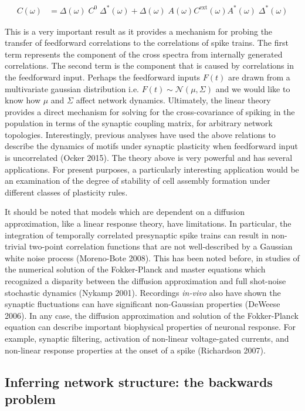 \documentclass{ucetd}
\begin{document}
\begin{align}
C(\omega) &= \Delta(\omega)\;C^{0}\;\Delta^{*}(\omega) + \Delta(\omega)\;A(\omega)C^{\mathrm{ext}}(\omega)A^{*}(\omega)\;\Delta^{*}(\omega)
\end{align} 

This is a very important result as it provides a mechanism for probing the transfer of feedforward correlations to the correlations of spike trains. The first term represents the component of the cross spectra from internally generated correlations. The second term is the component that is caused by correlations in the feedforward input. Perhaps the feedforward inputs $F(t)$ are drawn from a multivariate gaussian distribution i.e. $F(t) \sim \mathcal{N}(\mu,\Sigma)$ and we would like to know how $\mu$ and $\Sigma$ affect network dynamics. Ultimately, the linear theory provides a direct mechanism for solving for the cross-covariance of spiking in the population in terms of the synaptic coupling matrix, for arbitrary network topologies. Interestingly, previous analyses have used the above relations to describe the dynamics of motifs under synaptic plasticity when feedforward input is uncorrelated (Ocker 2015). The theory above is very powerful and has several applications. For present purposes, a particularly interesting application would be an examination of the degree of stability of cell assembly formation under different classes of plasticity rules. 

It should be noted that models which are dependent on a diffusion approximation, like a linear response theory, have limitations. In particular, the integration of temporally correlated presynaptic spike trains can result in non-trivial two-point correlation functions that are not well-described by a Gaussian white noise process (Moreno-Bote 2008). This has been noted before, in studies of the numerical solution of the Fokker-Planck and master equations which recognized a disparity between the diffusion approximation and full shot-noise stochastic dynamics (Nykamp 2001). Recordings \emph{in-vivo} also have shown the synaptic fluctuations can have significant non-Gaussian properties (DeWeese 2006). In any case, the diffusion approximation and solution of the Fokker-Planck equation can describe important biophysical properties of neuronal response. For example, synaptic filtering, activation of non-linear voltage-gated currents, and non-linear response properties at the onset of a spike (Richardson 2007).

\subsection{Inferring network structure: the backwards problem}
\end{document}
